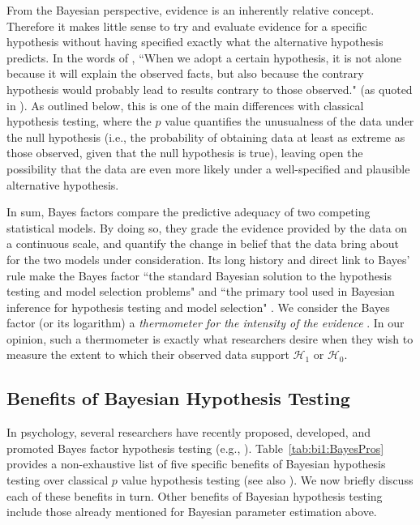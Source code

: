 From the Bayesian perspective, evidence is an inherently relative concept. Therefore it makes little sense to try and evaluate evidence for a specific hypothesis without having specified exactly what the alternative hypothesis predicts. In the words of , ``When we adopt a certain hypothesis, it is not alone because it will explain the observed facts, but also because the contrary hypothesis would probably lead to results contrary to those observed." (as quoted in ). As outlined below, this is one of the main differences with classical hypothesis testing, where the $p$ value quantifies the unusualness of the data under the null hypothesis (i.e., the probability of obtaining data at least as extreme as those observed, given that the null hypothesis is true), leaving open the possibility that the data are even more likely under a well-specified and plausible alternative hypothesis.

In sum, Bayes factors compare the predictive adequacy of two competing statistical models. By doing so, they grade the evidence provided by the data on a continuous scale, and quantify the change in belief that the data bring about for the two models under consideration. Its long history and direct link to Bayes' rule make the Bayes factor ``the standard Bayesian solution to the hypothesis testing and model selection problems" \cite[p. 648]{LewisRaftery1997} and ``the primary tool used in Bayesian inference for hypothesis testing and model selection" \cite[p. 378]{Berger2006}. We consider the Bayes factor (or its logarithm) a \emph{thermometer for the intensity of the evidence} \cite{Peirce1878Thermometer}. In our opinion, such a thermometer is exactly what researchers desire when they wish to measure the extent to which their observed data support $\mathcal{H}_1$ or $\mathcal{H}_0$.

\subsection{Benefits of Bayesian Hypothesis Testing}
In psychology, several researchers have recently proposed, developed, and promoted Bayes factor hypothesis testing (e.g., ). Table~\ref{tab:bi1:BayesPros} provides a non-exhaustive list of five specific benefits of Bayesian hypothesis testing over classical $p$ value hypothesis testing (see also ). We now briefly discuss each of these benefits in turn. Other benefits of Bayesian hypothesis testing include those already mentioned for Bayesian parameter estimation above.

